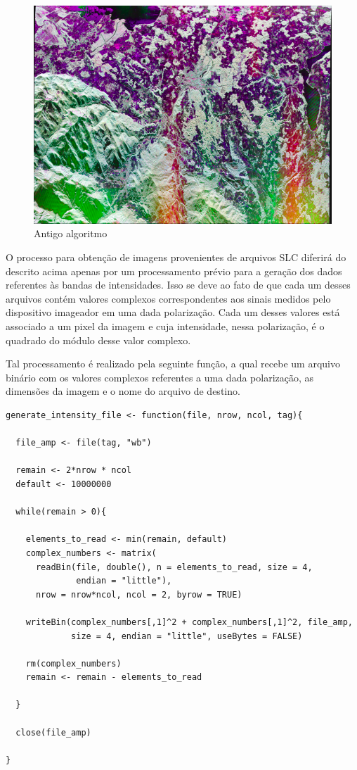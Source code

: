 \documentclass[12pt]{article}
\begin{document}
\begin{figure}[!ht]
	\begin{center}    
		\includegraphics[width = 120mm, scale = 0.5]{../../Images/Report_08_18/traunstein_trad_algorithm_reduced} \\ 
        Antigo algoritmo\\
	\end{center}
\end{figure}

\newpage

O processo para obtenção de imagens provenientes de arquivos SLC diferirá do descrito acima apenas por um processamento prévio para a geração dos dados referentes às bandas de intensidades. Isso se deve ao fato de que cada um desses arquivos contém valores complexos correspondentes aos sinais medidos pelo dispositivo imageador em uma dada polarização. Cada um desses valores está associado a um pixel da imagem e cuja intensidade, nessa polarização, é o quadrado do módulo desse valor complexo.

Tal processamento é realizado pela seguinte função, a qual recebe um arquivo binário com os valores complexos referentes a uma dada polarização, as dimensões da imagem e o nome do arquivo de destino.

\begin{verbatim}
generate_intensity_file <- function(file, nrow, ncol, tag){
  
  file_amp <- file(tag, "wb")
  
  remain <- 2*nrow * ncol
  default <- 10000000
  
  while(remain > 0){
    
    elements_to_read <- min(remain, default)
    complex_numbers <- matrix(
      readBin(file, double(), n = elements_to_read, size = 4,
              endian = "little"), 
      nrow = nrow*ncol, ncol = 2, byrow = TRUE) 
    
    writeBin(complex_numbers[,1]^2 + complex_numbers[,1]^2, file_amp,
             size = 4, endian = "little", useBytes = FALSE)
    
    rm(complex_numbers)
    remain <- remain - elements_to_read
    
  }
  
  close(file_amp)
  
}
\end{verbatim}
\end{document}

